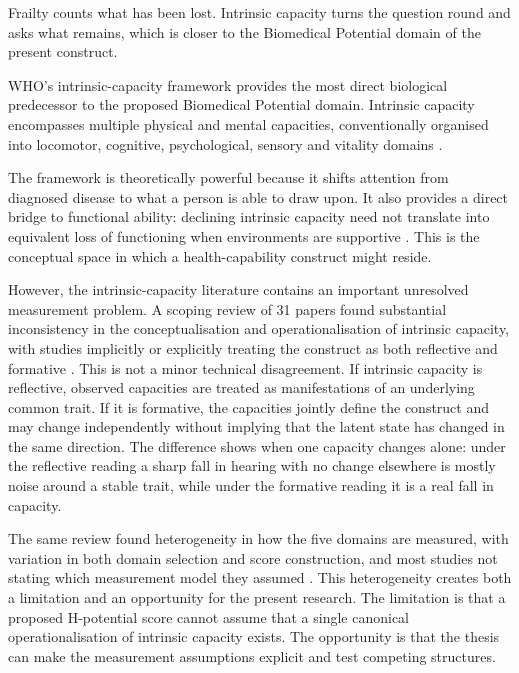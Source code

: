 Frailty counts what has been lost. Intrinsic capacity turns the question round and asks what remains, which is closer to the Biomedical Potential domain of the present construct.

WHO's intrinsic-capacity framework provides the most direct biological predecessor to the proposed Biomedical Potential domain. Intrinsic capacity encompasses multiple physical and mental capacities, conventionally organised into locomotor, cognitive, psychological, sensory and vitality domains \citep{who_intrinsic_capacity_2017,beard_intrinsic_2019}.

The framework is theoretically powerful because it shifts attention from diagnosed disease to what a person is able to draw upon. It also provides a direct bridge to functional ability: declining intrinsic capacity need not translate into equivalent loss of functioning when environments are supportive \citep{who_2015_ageing,who_healthy_ageing_2026}. This is the conceptual space in which a health-capability construct might reside.

However, the intrinsic-capacity literature contains an important unresolved measurement problem. A scoping review of 31 papers found substantial inconsistency in the conceptualisation and operationalisation of intrinsic capacity, with studies implicitly or explicitly treating the construct as both reflective and formative \citep{koivunen_2022}. This is not a minor technical disagreement. If intrinsic capacity is reflective, observed capacities are treated as manifestations of an underlying common trait. If it is formative, the capacities jointly define the construct and may change independently without implying that the latent state has changed in the same direction. The difference shows when one capacity changes alone: under the reflective reading a sharp fall in hearing with no change elsewhere is mostly noise around a stable trait, while under the formative reading it is a real fall in capacity.

The same review found heterogeneity in how the five domains are measured, with variation in both domain selection and score construction, and most studies not stating which measurement model they assumed \citep{koivunen_2022}. This heterogeneity creates both a limitation and an opportunity for the present research. The limitation is that a proposed H-potential score cannot assume that a single canonical operationalisation of intrinsic capacity exists. The opportunity is that the thesis can make the measurement assumptions explicit and test competing structures.

